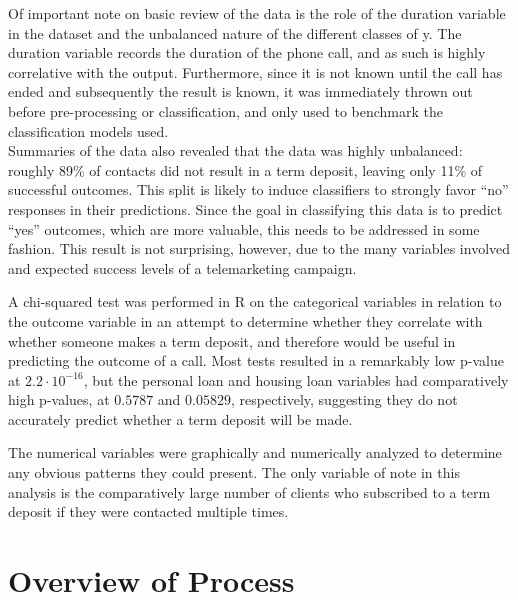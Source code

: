 \documentclass[prodmode]{acmsmall} %
\begin{document}
Of important note on basic review of the data is the role of the duration
variable in the dataset and the unbalanced nature of the different classes of y.
The duration variable records the duration of the phone call, and as such is
highly correlative with the output. Furthermore, since it is not known until the
call has ended and subsequently the result is known, it was immediately thrown
out before pre-processing or classification, and only used to benchmark the
classification models used. \\

Summaries of the data also revealed that the data was highly unbalanced: roughly
89\% of contacts did not result in a term deposit, leaving only 11\% of
successful outcomes. This split is likely to induce classifiers to strongly
favor ``no'' responses in their predictions. Since the goal in classifying this
data is to predict ``yes'' outcomes, which are more valuable, this needs to be
addressed in some fashion. This result is not surprising, however, due to the
many variables involved and expected success levels of a telemarketing campaign.

A chi-squared test was performed in R on the categorical variables in relation
to the outcome variable in an attempt to determine whether they correlate with
whether someone makes a term deposit, and therefore would be useful in
predicting the outcome of a call. Most tests resulted in a remarkably low
p-value at $2.2\cdot10^{-16}$, but the personal loan and housing loan variables
had comparatively high p-values, at $0.5787$ and $0.05829$, respectively,
suggesting they do not accurately predict whether a term deposit will be made.

The numerical variables were graphically and numerically analyzed to determine
any obvious patterns they could present. The only variable of note in this
analysis is the comparatively large number of clients who subscribed to a term
deposit if they were contacted multiple times.

\section{Overview of Process}

\begin{figure}[!t]
\end{figure}
\end{document}

